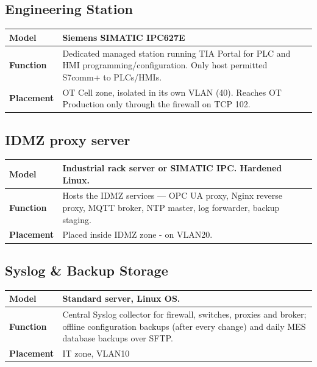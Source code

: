 \subsection{Engineering Station}
\renewcommand{\arraystretch}{1.3} %
\begin{tabularx}{\textwidth}{>{\bfseries}p{2.5cm} X}
    \toprule
    Model & Siemens SIMATIC IPC627E\\
    \midrule
    Function & Dedicated managed station running TIA Portal for PLC and HMI programming/configuration. Only host permitted S7comm+ to PLCs/HMIs.\\
    \midrule
    Placement & OT Cell zone, isolated in its own VLAN (40). Reaches OT Production only through the firewall on TCP 102.\\
    \midrule
\end{tabularx}

\subsection{IDMZ proxy server}
\renewcommand{\arraystretch}{1.3} %
\begin{tabularx}{\textwidth}{>{\bfseries}p{2.5cm} X}
    \toprule
    Model & Industrial rack server or SIMATIC IPC. Hardened Linux.\\
    \midrule
    Function & Hosts the IDMZ services — OPC UA proxy, Nginx reverse proxy, MQTT broker, NTP master, log forwarder, backup staging. \\
    \midrule
    Placement & Placed inside IDMZ zone - on VLAN20. \\
    \midrule
\end{tabularx}

\subsection{Syslog \& Backup Storage}
\renewcommand{\arraystretch}{1.3} %
\begin{tabularx}{\textwidth}{>{\bfseries}p{2.5cm} X}
    \toprule
    Model & Standard server, Linux OS. \\
    \midrule
    Function & Central Syslog collector for firewall, switches, proxies and broker; offline configuration backups (after every change) and daily MES database backups over SFTP.\\
    \midrule
    Placement & IT zone, VLAN10\\
    \midrule
\end{tabularx}

